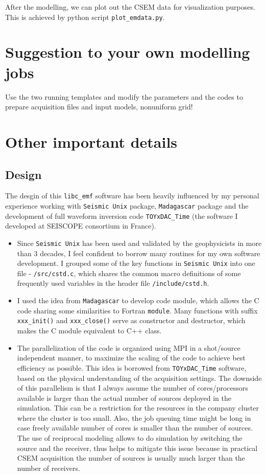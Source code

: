 \documentclass[10pt]{article}
\begin{document}
After the modelling, we can plot out the CSEM data for visualization purposes. This is achieved by python script \verb|plot_emdata.py|.

\section{Suggestion to your own modelling jobs}

Use the two running templates and modify the parameters and the codes to prepare acquisition files and input models, nonuniform grid!

\section{Other important details}

\subsection{Design}

The desgin of this \verb|libc_emf| software has been heavily influenced by my personal experience working with \texttt{Seismic Unix} package, \texttt{Madagascar} package and the development of full waveform inversion code \verb|TOYxDAC_Time| (the software I developed at SEISCOPE consortium in France). 
\begin{itemize}
\item Since \texttt{Seismic Unix} has been used and validated by the geophysicists in more than 3 decades, I feel confident to borrow many routines for my own software development. I grouped some of the key functions in \texttt{Seismic Unix} into one file - \verb|/src/cstd.c|, which shares the common macro definitions of some frequently used variables in the header file \verb|/include/cstd.h|. 

\item I used the idea from \texttt{Madagascar} to develop code module, which allows the C code sharing some similarities to Fortran \verb|module|. Many functions with suffix \verb|xxx_init()| and \verb|xxx_close()| serve as constructor and destructor, which makes the C module equivalent to C++ class. 

\item The parallelization of the code is organized using MPI in a shot/source independent manner, to maximize the scaling of the code to achieve best efficiency as possible. This idea is borrowed from \verb|TOYxDAC_Time| software, based on the physical understanding of the acquisition settings. The downside of this parallelism is that I always assume the number of cores/processors available is larger than the actual number of sources deployed in the simulation. This can be a restriction for the resources in the company cluster where the cluster is too small. Also, the job queuing time might be long in case freely available number of cores is smaller than the number of sources. The use of reciprocal modeling allows to do simulation by switching the source and the receiver, thus helps to mitigate this issue because in practical CSEM acquisition the number of sources is usually much larger than the number of receivers.
\end{itemize}
\end{document}
